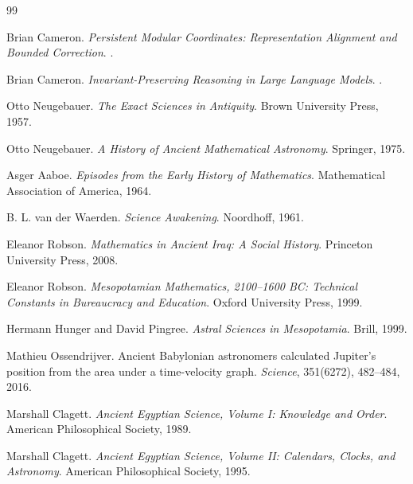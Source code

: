 \documentclass[11pt]{book}
\begin{document}
{}
\begin{thebibliography}{99}

Brian Cameron.
\newblock \emph{Persistent Modular Coordinates: Representation Alignment and Bounded Correction}.
.

Brian Cameron.
\newblock \emph{Invariant-Preserving Reasoning in Large Language Models}.
.

Otto Neugebauer.
\newblock \emph{The Exact Sciences in Antiquity}.
\newblock Brown University Press, 1957.

Otto Neugebauer.
\newblock \emph{A History of Ancient Mathematical Astronomy}.
\newblock Springer, 1975.

Asger Aaboe.
\newblock \emph{Episodes from the Early History of Mathematics}.
\newblock Mathematical Association of America, 1964.

B. L. van der Waerden.
\newblock \emph{Science Awakening}.
\newblock Noordhoff, 1961.

Eleanor Robson.
\newblock \emph{Mathematics in Ancient Iraq: A Social History}.
\newblock Princeton University Press, 2008.

Eleanor Robson.
\newblock \emph{Mesopotamian Mathematics, 2100--1600 BC: Technical Constants in Bureaucracy and Education}.
\newblock Oxford University Press, 1999.

Hermann Hunger and David Pingree.
\newblock \emph{Astral Sciences in Mesopotamia}.
\newblock Brill, 1999.

Mathieu Ossendrijver.
\newblock Ancient Babylonian astronomers calculated Jupiter's position from the area under a time-velocity graph.
\newblock \emph{Science}, 351(6272), 482--484, 2016.

Marshall Clagett.
\newblock \emph{Ancient Egyptian Science, Volume I: Knowledge and Order}.
\newblock American Philosophical Society, 1989.

Marshall Clagett.
\newblock \emph{Ancient Egyptian Science, Volume II: Calendars, Clocks, and Astronomy}.
\newblock American Philosophical Society, 1995.


\end{thebibliography}
\end{document}
